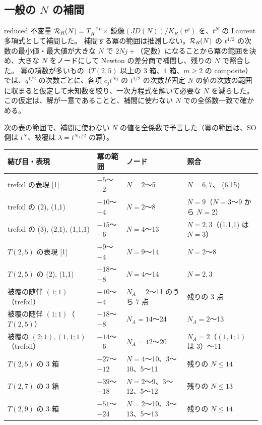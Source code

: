 \subsection{一般の $N$ の補間}
reduced 不変量 $\mathcal{R}_R(N) = T_R^{-2n}\times$ 鏡像$(JD(N))/K_R(t^\rho)$ を、$t^N$ の Laurent 多項式として補間した。
補間する冪の範囲は推測しない。$\mathcal{R}_R(N)$ の $t^{1/2}$ の次数の最小値・最大値が大きな $N$ で $2Nj + $（定数）になることから冪の範囲を決め、大きな $N$ をノードにして Newton の差分商で補間し、残りの $N$ で照合した。
冪の項数が多いもの（$T(2,5)$ 以上の 3 箱、4 箱、$m \ge 2$ の composite）では、$q^{1/2}$ の次数ごとに、各項 $c_j t^{Nj}$ の $t^{1/2}$ の次数が固定 $N$ の値の次数の範囲に収まると仮定して未知数を絞り、一次方程式を解いて必要な $N$ を減らした。この仮定は、解が一意であることと、補間に使わない $N$ での全係数一致で確かめる。
\begin{compresult}\label{cr:interp}
次の表の範囲で、補間に使わない $N$ の値を全係数で予言した（冪の範囲は、SO 側は $t^N$、被覆は $\lambda = t^{N_A/2}$ の冪）。
\begin{center}
\scriptsize
\setlength{\tabcolsep}{3pt}
\begin{tabular}{llll}
\toprule
結び目・表現 & 冪の範囲 & ノード & 照合 \\
\midrule
trefoil の表現 [1] & $-5$〜$-2$ & $N = 2$〜5 & $N = 6, 7$、\cite{AgSc12} (6.15) \\
trefoil の (2), (1,1) & $-10$〜$-4$ & $N = 2$〜8 & $N = 9$（$N = 3$〜9 から $N = 2$） \\
trefoil の (3), (2,1), (1,1,1) & $-15$〜$-6$ & $N = 4$〜13 & $N = 2, 3$（(1,1,1) は $N = 3$） \\
$T(2,5)$ の表現 [1] & $-9$〜$-4$ & $N = 9$〜14 & $N = 2$〜8 \\
$T(2,5)$ の (2), (1,1) & $-18$〜$-8$ & $N = 4$〜14 & $N = 2, 3$ \\
被覆の随伴 $(1;1)$（trefoil） & $-10$〜$-4$ & $N_A = 2$〜11 のうち 7 点 & 残りの 3 点 \\
被覆の随伴 $(1;1)$（$T(2,5)$） & $-18$〜$-8$ & $N_A = 14$〜24 & $N_A = 2$〜13 \\
被覆の $(2;1), (1,1;1)$（trefoil） & $-14$〜$-6$ & $N_A = 12$〜20 & $N_A = 2$（$(1,1;1)$ は 3）〜11 \\
\midrule
$T(2,5)$ の 3 箱 & $-27$〜$-12$ & $N = 4$〜10、3〜10、5〜11 & 残りの $N \le 14$ \\
$T(2,7)$ の 3 箱 & $-39$〜$-18$ & $N = 2$〜9、3〜12、5〜12 & 残りの $N \le 13$ \\
$T(2,9)$ の 3 箱 & $-51$〜$-24$ & $N = 2$〜10、3〜13、5〜13 & 残りの $N \le 14$ \\

\end{tabular}
\end{center}
\end{compresult}
